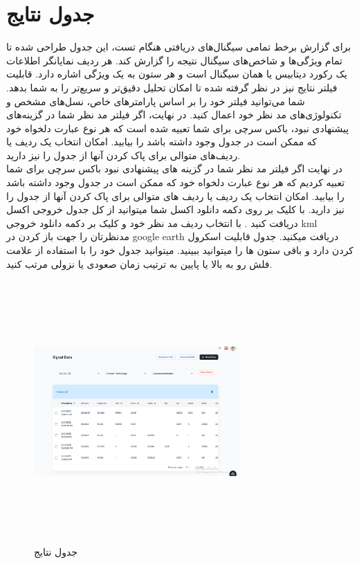 \documentclass{report}
\begin{document}
\section{جدول نتایج}
برای گزارش برخط تمامی سیگنال‌های دریافتی هنگام تست، این جدول طراحی شده تا تمام ویژگی‌ها و شاخص‌های سیگنال نتیجه را گزارش کند. هر ردیف نمایانگر اطلاعات یک رکورد دیتابیس یا همان سیگنال است و هر ستون به یک ویژگی اشاره دارد.
قابلیت فیلتر نتایج نیز در نظر گرفته شده تا امکان تحلیل دقیق‌تر و سریع‌تر را به شما بدهد. شما می‌توانید فیلتر خود را بر اساس پارامترهای خاص، نسل‌های مشخص و تکنولوژی‌های مد نظر خود اعمال کنید.
در نهایت، اگر فیلتر مد نظر شما در گزینه‌های پیشنهادی نبود، باکس سرچی برای شما تعبیه شده است که هر نوع عبارت دلخواه خود که ممکن است در جدول وجود داشته باشد را بیابید. امکان انتخاب یک ردیف یا ردیف‌های متوالی برای پاک کردن آنها از جدول را نیز دارید.
\\
در نهایت اگر فیلتر مد نظر شما در گزینه های پیشنهادی نبود باکس سرچی برای شما تعبیه کردیم که هر نوع عبارت دلخواه خود که ممکن است در جدول وجود داشته باشد را بیابید.
امکان انتخاب یک ردیف یا ردیف های متوالی برای پاک کردن آنها از جدول را نیز دارید.
با کلیک بر روی دکمه دانلود اکسل شما میتوانید از کل جدول خروجی اکسل دریافت کنید .
با انتخاب ردیف مد نظر خود و کلیک بر دکمه دانلود خروجی kml  مدنظرتان را جهت باز کردن در google earth دریافت میکنید.
جدول قابلیت اسکرول کردن دارد و باقی ستون ها را میتوانید ببینید.
میتوانید جدول خود را با استفاده از علامت فلش رو به بالا یا پایین به ترتیب زمان صعودی یا نزولی مرتب کنید.
\begin{figure}[!htbp]
	\centering
	\includegraphics[width=0.7\textwidth,height=10cm,keepaspectratio]{Pic/final_table}
	\caption{جدول نتایج}
	\label{fig:table}
\end{figure}
\end{document}
